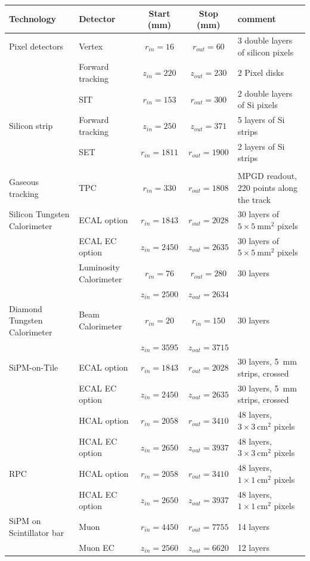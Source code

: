 \documentclass[%
 amsmath,amssymb,
 aps,
 longbibliography,
]{revtex4-1}
\renewcommand{\toprule}{\hline}
\newcommand{\midrule}{\hline}
\begin{document}
\begin{table}[th]
    \centering
    \begin{tabular}{|l|l|c|c|p{4cm}|}
    \toprule
        {\bf Technology} & {\bf Detector} & {\bf Start (mm)}   & {\bf Stop (mm)} & {\bf comment} \\
        \midrule
Pixel detectors & Vertex & $r_{in}=16$   & $r_{out}=60$   & 3 double layers of silicon pixels \\
& Forward tracking  & $z_{in}=220$ & $z_{out}=230$ & 2 Pixel disks \\
 & SIT    & $r_{in}=153$  & $r_{out}=300$  & 2 double layers of Si pixels            \\
\midrule
Silicon strip & Forward tracking  & $z_{in}=250$ & $z_{out}=371$ & 5 layers of Si strips\\
                & SET    & $r_{in}=1811$ & $r_{out}=1900$ & 2 layers of Si strips           \\
                & & & & \\
\midrule
Gaseous tracking & TPC & $r_{in}=330$ & $r_{out}=1808$ & MPGD readout, 220 points along the track\\
\midrule
Silicon Tungsten Calorimeter & ECAL option& $r_{in}=1843$ & $r_{out}=2028$ & 30 layers of $5\times 5~\mathrm{mm}^2$ pixels \\
& ECAL EC option & $z_{in}=2450$ & $z_{out}=2635$ & 30 layers of $5\times 5~\mathrm{mm}^2$ pixels \\
& Luminosity Calorimeter &$r_{in}=76$ & $r_{out}=280$& 30 layers\\
& &$z_{in}=2500$ & $z_{out}=2634$& \\
\midrule
Diamond Tungsten Calorimeter & Beam Calorimeter &$r_{in}=20$ &$r_{in}=150$& 30 layers\\
&& $z_{in}=3595$&$z_{out}=3715$&\\
\midrule
SiPM-on-Tile & ECAL option   & $r_{in}=1843$ & $r_{out}=2028$ & 30 layers, 5~mm strips, crossed\\
& ECAL EC option& $z_{in}=2450$ & $z_{out}=2635$ & 30 layers, 5~mm strips, crossed\\
             & HCAL option   & $r_{in}=2058$ & $r_{out}=3410$ & 48 layers, $3\times 3~\mathrm{cm}^2$ pixels\\
             & HCAL EC option& $z_{in}=2650$ & $z_{out}=3937$ & 48 layers, $3\times 3~\mathrm{cm}^2$ pixels\\
\midrule
RPC          & HCAL option   & $r_{in}=2058$ & $r_{out}=3410$ & 48 layers, $1 \times 1 ~\mathrm{cm}^2$ pixels \\
& HCAL EC option & $z_{in}=2650$ & $z_{out}=3937$ & 48 layers, $1 \times 1~\mathrm{cm}^2$ pixels\\
\midrule
SiPM on Scintillator bar & Muon & $r_{in}=4450$ & $r_{out}=7755$ & 14 layers \\
& Muon EC & $z_{in}=2560$ & $z_{out}=6620$ & 12 layers \\


\end{tabular}
\end{table}
\end{document}
